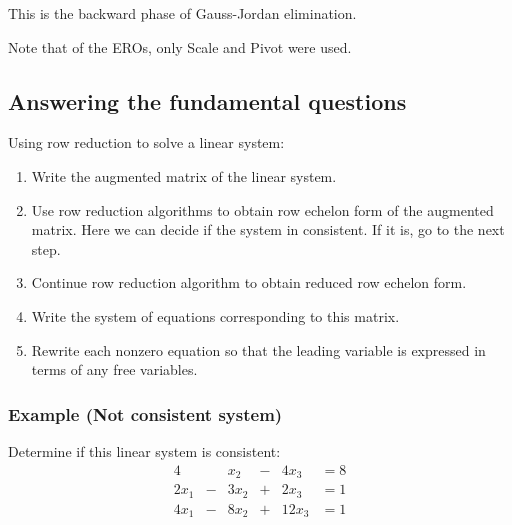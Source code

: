 \documentclass[../linear-algebra.tex]{subfiles}
\begin{document}
\noindent This is the backward phase of Gauss-Jordan elimination.

\medskip

\noindent Note that of the EROs, only Scale and Pivot were used.

\subsection{Answering the fundamental questions}
Using row reduction to solve a linear system:
\begin{enumerate}
    \item Write the augmented matrix of the linear system.
    \item Use row reduction algorithms to obtain row echelon form 
    of the augmented matrix. Here we can decide if the system in consistent.
    If it is, go to the next step.
    \item Continue row reduction algorithm to obtain reduced row echelon form.
    \item Write the system of equations corresponding to this matrix.
    \item Rewrite each nonzero equation so that the leading variable
    is expressed in terms of any free variables.    
\end{enumerate}

\subsubsection{Example (Not consistent system)}
Determine if this linear system is consistent:
\begin{alignat*}{4}
       &      &      x_2 & {}-{} &  4x_3 &= 8 \\
  2x_1 & {}-{} &  3x_2 & {}+{} &  2x_3 &= 1 \\
  4x_1 & {}-{} &  8x_2 & {}+{} & 12x_3 &= 1
\end{alignat*}
\end{document}
